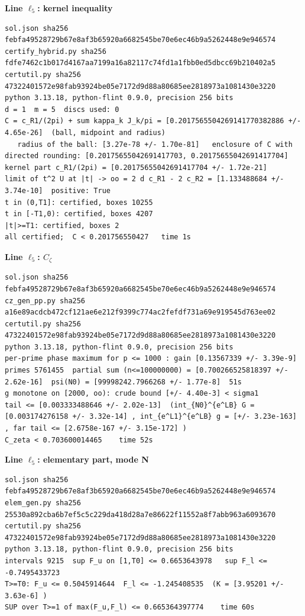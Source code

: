\documentclass[11pt,reqno]{amsart}
\numberwithin{equation}{section}
\theoremstyle{definition}
\theoremstyle{remark}
\newcommand{\appsub}[1]{\par\medskip\noindent\textbf{#1}\par\nobreak\smallskip}
\begin{document}
\appsub{Line $\ell_{5}$: kernel inequality}
\begin{lstlisting}
sol.json sha256 febfa49528729b67e8af3b65920a6682545be70e6ec46b9a5262448e9e946574
certify_hybrid.py sha256 fdfe7462c1b017d4167aa7199a16a82117c74fd1a1fbb0ed5dbcc69b210402a5
certutil.py sha256 47322401572e98fab93924be05e7172d9d88a80685ee2818973a1081430e3220
python 3.13.18, python-flint 0.9.0, precision 256 bits
d = 1  m = 5  discs used: 0 
C = c_R1/(2pi) + sum kappa_k J_k/pi = [0.2017565504269141770382886 +/- 4.65e-26]  (ball, midpoint and radius)
   radius of the ball: [3.27e-78 +/- 1.70e-81]   enclosure of C with directed rounding: [0.20175655042691417703, 0.20175655042691417704]
kernel part c_R1/(2pi) = [0.20175655042691417704 +/- 1.72e-21]
limit of t^2 U at |t| -> oo = 2 d c_R1 - 2 c_R2 = [1.133488684 +/- 3.74e-10]  positive: True
t in (0,T1]: certified, boxes 10255
t in [-T1,0): certified, boxes 4207
|t|>=T1: certified, boxes 2
all certified;  C < 0.201756550427   time 1s
\end{lstlisting}
\appsub{Line $\ell_{5}$: $C_\zeta$}
\begin{lstlisting}
sol.json sha256 febfa49528729b67e8af3b65920a6682545be70e6ec46b9a5262448e9e946574
cz_gen_pp.py sha256 a16e89acdcb472cf121ae6e212f9399c774ac2fefdf731a69e919545d763ee02
certutil.py sha256 47322401572e98fab93924be05e7172d9d88a80685ee2818973a1081430e3220
python 3.13.18, python-flint 0.9.0, precision 256 bits
per-prime phase maximum for p <= 1000 : gain [0.13567339 +/- 3.39e-9]
primes 5761455  partial sum (n<=100000000) = [0.700266525818397 +/- 2.62e-16]  psi(N0) = [99998242.7966268 +/- 1.77e-8]  51s
g monotone on [2000, oo): crude bound [+/- 4.40e-3] < sigma1
tail <= [0.003333488646 +/- 2.02e-13]  (int_{N0}^{e^LB} G = [0.003174276158 +/- 3.32e-14] , int_{e^L1}^{e^LB} g = [+/- 3.23e-163] , far tail <= [2.6758e-167 +/- 3.15e-172] )
C_zeta < 0.703600014465    time 52s
\end{lstlisting}
\appsub{Line $\ell_{5}$: elementary part, mode N}
\begin{lstlisting}
sol.json sha256 febfa49528729b67e8af3b65920a6682545be70e6ec46b9a5262448e9e946574
elem_gen.py sha256 25530a892cba6b7ef5c5c229da418d28a7e86622f11552a8f7abb963a6093670
certutil.py sha256 47322401572e98fab93924be05e7172d9d88a80685ee2818973a1081430e3220
python 3.13.18, python-flint 0.9.0, precision 256 bits
intervals 9215  sup F_u on [1,T0] <= 0.6653643978   sup F_l <= -0.7495433723
T>=T0: F_u <= 0.5045914644  F_l <= -1.245408535  (K = [3.95201 +/- 3.63e-6] )
SUP over T>=1 of max(F_u,F_l) <= 0.665364397774    time 60s
\end{lstlisting}
\end{document}
